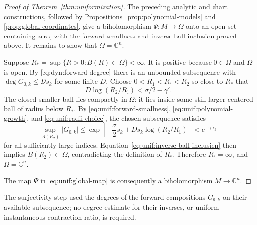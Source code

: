 \documentclass[11pt]{article}
\theoremstyle{definition}
\theoremstyle{remark}
\newcommand{\C}{\mathbb C}
\newcommand{\abs}[1]{\lvert#1\rvert}
\numberwithin{equation}{section}
\begin{document}
\begin{proof}[Proof of Theorem~\ref{thm:uniformization}]
The preceding analytic and chart constructions, followed by
Propositions~\ref{prop:polynomial-models} and
\ref{prop:global-coordinates}, give a biholomorphism $\Psi:M\to\Omega$
onto an open set containing zero, with the forward smallness and
inverse-ball inclusion proved above.  It remains to show that
$\Omega=\C^n$.

Suppose
$R_*=\sup\{R>0:B(R)\subset\Omega\}<\infty$.
It is positive because $0\in\Omega$ and $\Omega$ is open.
By \eqref{eq:dyn:forward-degree} there is an unbounded subsequence
with $\deg G_{0,k}\le Ds_k$ for some finite $D$.
Choose
$0<R_1<R_*<R_2$ so close to $R_*$ that
\begin{equation}
 D\log(R_2/R_1)<\sigma/2-\gamma'.
 \label{eq:unif:radii-choice}
\end{equation}
The closed smaller ball lies compactly in $\Omega$: it lies inside
some still larger centered ball of radius below $R_*$.
By \eqref{eq:unif:forward-smallness},
\eqref{eq:unif:polynomial-growth}, and
\eqref{eq:unif:radii-choice}, the chosen subsequence satisfies
\[
 \sup_{B(R_2)}\abs{G_{0,k}}
 \le \exp\left[
   -\frac{\sigma}{2}s_k+Ds_k\log(R_2/R_1)\right]
 < e^{-\gamma's_k}
\]
for all sufficiently large indices.
Equation~\eqref{eq:unif:inverse-ball-inclusion} then implies
$B(R_2)\subset\Omega$, contradicting the definition of $R_*$.
Therefore $R_*=\infty$, and $\Omega=\C^n$.

The map $\Psi$ in \eqref{eq:unif:global-map} is consequently a
biholomorphism $M\to\C^n$.
\end{proof}

The surjectivity step used the degrees
of the forward compositions $G_{0,k}$ on their available
subsequence; no degree estimate for their inverses, or uniform
instantaneous contraction ratio, is required.
\end{document}
